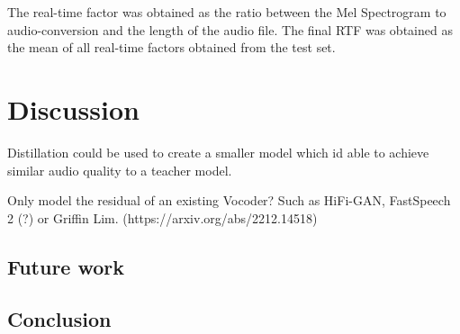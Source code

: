 \documentclass{article}
\begin{document}
The real-time factor was obtained as the ratio between the Mel Spectrogram to audio-conversion and the length of the audio file. The final RTF was obtained as the mean of all real-time factors obtained from the test set.

\newpage
\section{Discussion}

Distillation could be used to create a smaller model which id able to achieve similar audio quality to a teacher model.

Only model the residual of an existing Vocoder? Such as HiFi-GAN, FastSpeech 2 (?) or Griffin Lim. (https://arxiv.org/abs/2212.14518)

\subsection{Future work}

\subsection{Conclusion}

\newpage



\end{document}
